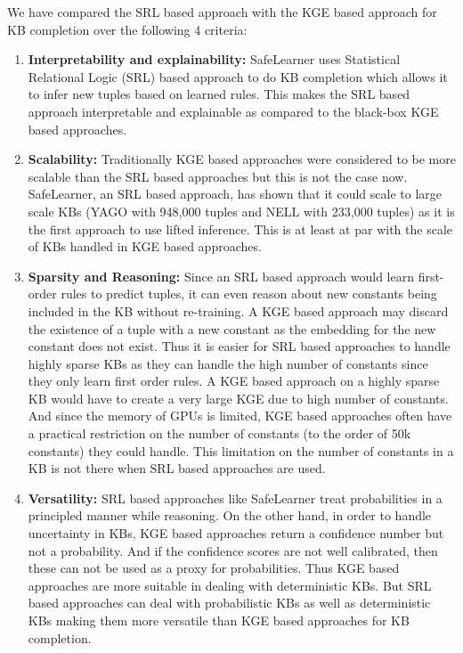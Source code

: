 \documentclass[akbc,twoside,11pt]{article}
\newcommand{\algorithmname}{SafeLearner\xspace}
\begin{document}
We have compared the SRL based approach with the KGE based approach for KB completion over the following 4 criteria:
\begin{enumerate}
    \item \textbf{Interpretability and explainability:} \algorithmname uses Statistical Relational Logic (SRL) based approach to do KB completion which allows it to infer new tuples based on learned rules. This makes the SRL based approach interpretable and explainable as compared to the black-box KGE based approaches.
    \item \textbf{Scalability:} Traditionally KGE based approaches were considered to be more scalable than the SRL based approaches but this is not the case now. \algorithmname, an SRL based approach, has shown that it could scale to large scale KBs (YAGO with 948,000 tuples and NELL with 233,000 tuples) as it is the first approach to use lifted inference. This is at least at par with the scale of KBs handled in KGE based approaches.
    \item \textbf{Sparsity and Reasoning:} Since an SRL based approach would learn first-order rules to predict tuples, it can even reason about new constants being included in the KB without re-training. A KGE based approach may discard the existence of a tuple with a new constant as the embedding for the new constant does not exist. Thus it is easier for SRL based approaches to handle highly sparse KBs as they can handle the high number of constants since they only learn first order rules. A KGE based approach on a highly sparse KB would have to create a very large KGE due to high number of constants. And since the memory of GPUs is limited, KGE based approaches often have a practical restriction on the number of constants (to the order of 50k constants) they could handle. This limitation on the number of constants in a KB is not there when SRL based approaches are used.
    \item \textbf{Versatility:} SRL based approaches like \algorithmname treat probabilities in a principled manner while reasoning. On the other hand, in order to handle uncertainty in KBs, KGE based approaches return a confidence number but not a probability. And if the confidence scores are not well calibrated, then these can not be used as a proxy for probabilities. Thus KGE based approaches are more suitable in dealing with deterministic KBs. But SRL based approaches can deal with probabilistic KBs as well as deterministic KBs making them more versatile than KGE based approaches for KB completion.
\end{enumerate}
\end{document}
